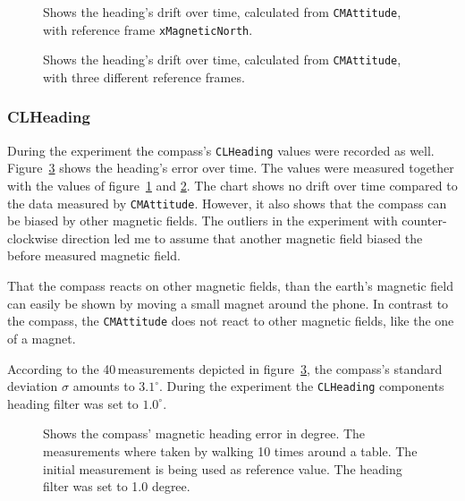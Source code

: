 \begin{figure}[htbp]
	
	\caption{Shows the heading's drift over time, calculated from \texttt{CMAttitude}, with reference frame \texttt{xMagneticNorth}.}
	\label{fig:evalAttitude:xMagneticNorth}
\end{figure}

\begin{figure}[htbp]
	
	\caption{Shows the heading's drift over time, calculated from \texttt{CMAttitude}, with three different reference frames.}
	\label{fig:evalAttitude:referenceframes}
\end{figure}

\subsubsection*{CLHeading}
During the experiment the compass's \texttt{CLHeading} values were recorded as well. Figure~\ref{fig:eval:compass} shows the heading's error over time. The values were measured together with the values of figure~\ref{fig:evalAttitude:xMagneticNorth} and \ref{fig:evalAttitude:referenceframes}. The chart shows no drift over time compared to the data measured by \texttt{CMAttitude}. However, it also shows that the compass can be biased by other magnetic fields. The outliers in the experiment with counter-clockwise direction led me to assume that another magnetic field biased the before measured magnetic field.

That the compass reacts on other magnetic fields, than the earth's magnetic field can easily be shown by moving a small magnet around the phone. In contrast to the compass, the \texttt{CMAttitude} does not react to other magnetic fields, like the one of a magnet.

According to the 40\,measurements depicted in figure~\ref{fig:eval:compass}, the compass's standard deviation $\sigma$ amounts to $3.1^{\circ}$. During the experiment the \texttt{CLHeading} components heading filter was set to $1.0^{\circ}$.


\begin{figure}[htbp]
	
	\caption{Shows the compass' magnetic heading error in degree. The measurements where taken by walking 10 times around a table. The initial measurement is being used as reference value. The heading filter was set to 1.0 degree.}
	\label{fig:eval:compass}
\end{figure}

